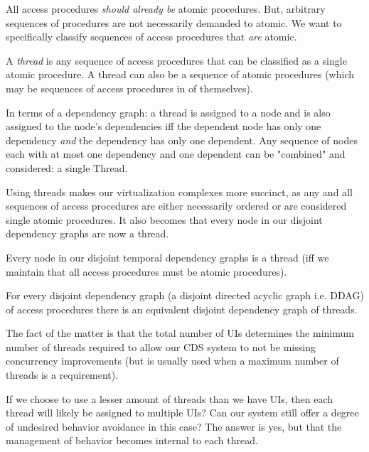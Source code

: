 All access procedures \textit{should already be} atomic procedures. But, arbitrary sequences of procedures are not necessarily demanded to atomic. We want to specifically classify sequences of access procedures that \textit{are} atomic.

\begin{con-def}[Thread]
	\label{thread}
	A \textit{thread} is any sequence of access procedures that can be classified as a single atomic procedure. A thread can also be a  sequence of atomic procedures (which may be sequences of access procedures in of themselves).
\end{con-def}

In terms of a dependency graph: a thread is assigned to a node and is also assigned to the node's dependencies iff the dependent node has only one dependency \textit{and} the dependency has only one dependent. Any sequence of nodes each with at most one dependency and one dependent can be "combined" and considered: a single Thread.

Using threads makes our virtualization complexes more succinct, as any and all sequences of access procedures are either necessarily ordered or are considered single atomic procedures. It also becomes that every node in our disjoint dependency graphs are now a thread.

\begin{props}
	\label{nodes-are-threads}
	Every node in our disjoint temporal dependency graphs is a thread (iff we maintain that all access procedures must be atomic procedures).
\end{props}

\begin{con-cor}
	\label{thread-ddag}
	For every disjoint dependency graph (a disjoint directed acyclic graph i.e. DDAG) of access procedures there is an equivalent disjoint dependency graph of threads.
\end{con-cor}

The fact of the matter is that the total number of UIs determines the minimum number of threads required to allow our CDS system to not be missing concurrency improvements (but is usually used when a maximum number of threads is a requirement).

If we choose to use a lesser amount of threads than we have UIs, then each thread will likely be assigned to multiple UIs? Can our system still offer a degree of undesired behavior avoidance in this case? The answer is yes, but that the management of behavior becomes internal to each thread.

